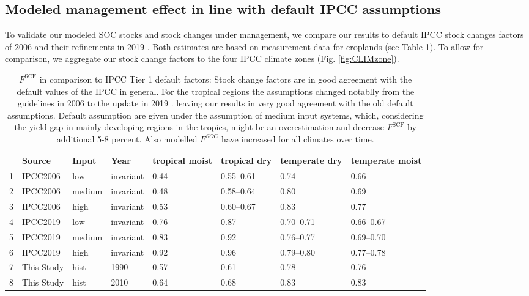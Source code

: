 \documentclass[gc, manuscript]{copernicus}
\begin{document}
\hypertarget{sec:ipcccompare}{%
\subsection{Modeled management effect in line with default IPCC assumptions}\label{sec:ipcccompare}}

To validate our modeled SOC stocks and stock changes under management, we compare our results to default IPCC stock changes factors of 2006 \citep{eggleston_ipcc_2006} and their refinements in 2019 \citep{calvo_buendia_ipcc_2019}. Both estimates are based on measurement data for croplands (see Table \ref{tab:SCFglo}). To allow for comparison, we aggregate our stock change factors to the four IPCC climate zones (Fig. \ref{fig:CLIMzone}).

\begin{table}[ht]
\centering
\caption{$F^{\mathrm{SCF}}$ in comparison to IPCC Tier 1 default factors: Stock change factors are in good agreement with the default values of the IPCC in general. For the tropical regions the assumptions changed notablly from the guidelines in 2006 \citep{eggleston_ipcc_2006} to the update in 2019 \citep{calvo_buendia_ipcc_2019}. leaving our results in very good agreement with the old default assumptions. Default assumption are given under the assumption of medium input systems, which, considering the yield gap in mainly developing regions in the tropics, might be an overestimation and decrease $F^{\mathrm{SCF}}$ by additional 5-8 percent. Also modelled $F^{SOC}$ have increased for all climates over time.} 
\label{tab:SCFglo}
\begin{tabular}{rlllllll}
  \hline
 & Source & Input & Year & tropical moist & tropical dry & temperate dry & temperate moist \\ 
  \hline
1 & IPCC2006 & low & invariant & 0.44 & 0.55--0.61 & 0.74 & 0.66 \\ 
  2 & IPCC2006 & medium & invariant & 0.48 & 0.58--0.64 & 0.80 & 0.69 \\ 
  3 & IPCC2006 & high & invariant & 0.53 & 0.60--0.67 & 0.83 & 0.77 \\ 
  4 & IPCC2019 & low & invariant & 0.76 & 0.87 & 0.70--0.71 & 0.66--0.67 \\ 
  5 & IPCC2019 & medium & invariant & 0.83 & 0.92 & 0.76--0.77 & 0.69--0.70 \\ 
  6 & IPCC2019 & high & invariant & 0.92 & 0.96 & 0.79--0.80 & 0.77--0.78 \\ 
  7 & This Study & hist & 1990 & 0.57 & 0.61 & 0.78 & 0.76 \\ 
  8 & This Study & hist & 2010 & 0.64 & 0.68 & 0.83 & 0.83 \\ 
   \hline
\end{tabular}
\end{table}
\end{document}
